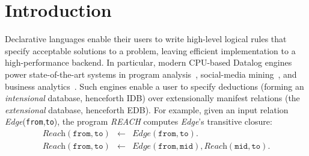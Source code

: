 \documentclass[nonacm,sigplan]{acmart}
\begin{document}
\section{Introduction}
\label{sec:intro}

Declarative languages enable their users to write high-level logical rules that specify acceptable solutions to a problem, leaving efficient implementation to a high-performance backend. In particular, modern CPU-based Datalog engines power state-of-the-art systems in program analysis~\cite{bravenboer2009doop,flores2020ddisasm,balatsouras2016cclyzer,recstep}, social-media mining~\cite{shkapsky2016big,gu2019rasql,socialite, skvortsov2024logica}, and  business analytics~\cite{business-Datalog}. Such engines enable a user to specify deductions (forming an \emph{intensional} database, henceforth IDB) over extensionally manifest relations (the \emph{extensional} database, henceforth EDB). For example, given an input relation \textit{Edge}(\texttt{from},\texttt{to}), the program \textit{REACH} computes
\textit{Edge}'s transitive closure:
\[
\begin{array}{lcl}
    \textit{Reach}(\texttt{from},\texttt{to})  & \!\!\!\! \leftarrow & \!\!  \textit{Edge}(\texttt{from}, \texttt{to}).   \\
    \textit{Reach}(\texttt{from}, \texttt{to}) & \!\!\!\! \leftarrow & \!\! \textit{Edge}(\texttt{from}, \texttt{mid}), \textit{Reach}(\texttt{mid}, \texttt{to}).
\end{array}
\]
\end{document}
